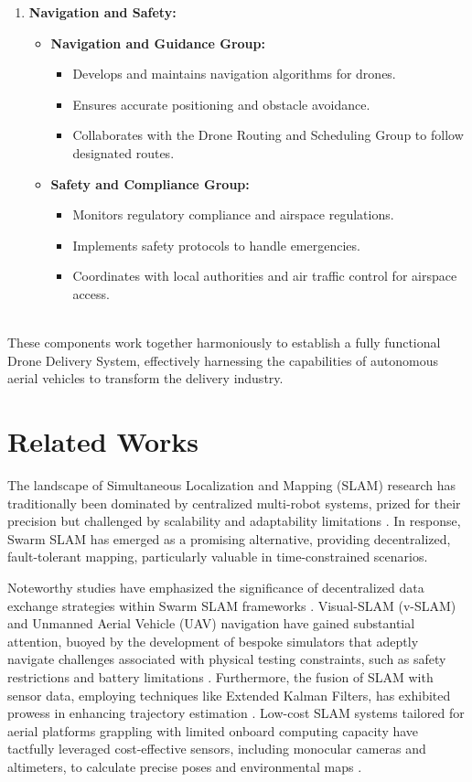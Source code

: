 \documentclass[preprint,12pt]{elsarticle}
\begin{document}
\begin{enumerate}
\item \textbf{Navigation and Safety:}
\begin{itemize}
  \item \textbf{Navigation and Guidance Group:}
    \begin{itemize}
      \item Develops and maintains navigation algorithms for drones.
      \item Ensures accurate positioning and obstacle avoidance.
      \item Collaborates with the Drone Routing and Scheduling Group to follow designated routes.
    \end{itemize}
  \item \textbf{Safety and Compliance Group:}
    \begin{itemize}
      \item Monitors regulatory compliance and airspace regulations.
      \item Implements safety protocols to handle emergencies.
      \item Coordinates with local authorities and air traffic control for airspace access.
    \end{itemize}
\end{itemize}

\end{enumerate}\\

These components work together harmoniously to establish a fully functional Drone Delivery System, effectively harnessing the capabilities of autonomous aerial vehicles to transform the delivery industry.

\section{Related Works}

The landscape of Simultaneous Localization and Mapping (SLAM) research has traditionally been dominated by centralized multi-robot systems, prized for their precision but challenged by scalability and adaptability limitations \cite{li2018review}. In response, Swarm SLAM has emerged as a promising alternative, providing decentralized, fault-tolerant mapping, particularly valuable in time-constrained scenarios.

Noteworthy studies have emphasized the significance of decentralized data exchange strategies within Swarm SLAM frameworks \cite{li2018review}. Visual-SLAM (v-SLAM) and Unmanned Aerial Vehicle (UAV) navigation have gained substantial attention, buoyed by the development of bespoke simulators that adeptly navigate challenges associated with physical testing constraints, such as safety restrictions and battery limitations \cite{zhou2018routing}. Furthermore, the fusion of SLAM with sensor data, employing techniques like Extended Kalman Filters, has exhibited prowess in enhancing trajectory estimation \cite{chen2022end}. Low-cost SLAM systems tailored for aerial platforms grappling with limited onboard computing capacity have tactfully leveraged cost-effective sensors, including monocular cameras and altimeters, to calculate precise poses and environmental maps \cite{gupta2022slam}.
\end{document}
